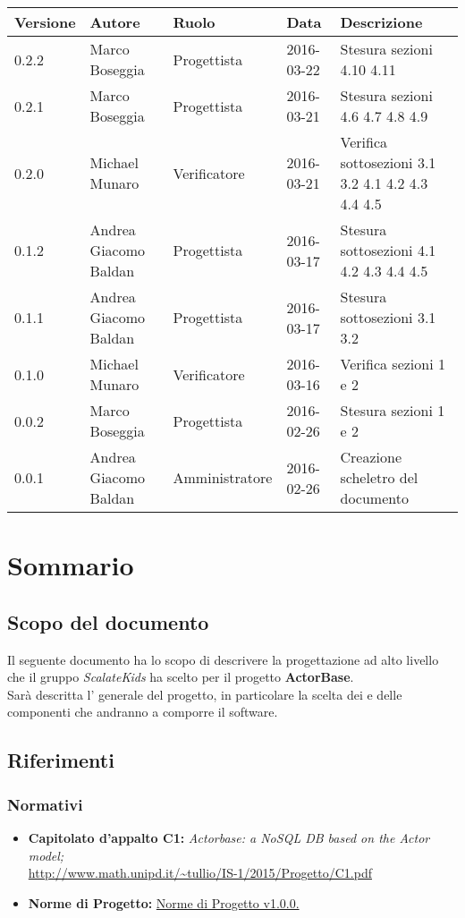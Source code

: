 \documentclass{scalatekids-article}
\begin{document}
\begin{center}
  \begin{tabular}{| l | l | l | l | p{5cm} |}
    \hline
    Versione & Autore & Ruolo & Data & Descrizione \\
    \hline
    0.2.2 & Marco Boseggia & Progettista & 2016-03-22 & Stesura sezioni 4.10 4.11\\
    \hline
    0.2.1 & Marco Boseggia & Progettista & 2016-03-21 & Stesura sezioni 4.6 4.7 4.8 4.9\\
    \hline
    0.2.0 & Michael Munaro & Verificatore & 2016-03-21 & Verifica sottosezioni 3.1 3.2 4.1 4.2 4.3 4.4 4.5\\
    \hline
    0.1.2 & Andrea Giacomo Baldan & Progettista & 2016-03-17 & Stesura sottosezioni 4.1 4.2 4.3 4.4 4.5\\
    \hline
    0.1.1 & Andrea Giacomo Baldan & Progettista & 2016-03-17 & Stesura sottosezioni 3.1 3.2\\
    \hline
    0.1.0 & Michael Munaro & Verificatore & 2016-03-16 & Verifica sezioni 1 e 2\\
    \hline
    0.0.2 & Marco Boseggia & Progettista & 2016-02-26 & Stesura sezioni 1 e 2\\
    \hline
    0.0.1 & Andrea Giacomo Baldan & Amministratore & 2016-02-26 & Creazione scheletro del documento\\
    \hline
  \end{tabular}
\end{center}
\tableofcontents
\newpage
{}
\section{Sommario}
\subsection{Scopo del documento}
Il seguente documento ha lo scopo di descrivere la progettazione ad alto livello che il gruppo \textit{ScalateKids} ha scelto per il progetto \textbf{ActorBase}.\\
Sarà descritta l' generale del progetto, in particolare la scelta dei  e delle componenti che andranno a comporre il software.
\prodPurpose
\glossExpl
\subsection{Riferimenti}
\subsubsection{Normativi}
\begin{itemize}
\item\textbf{Capitolato d'appalto C1:} \textit{Actorbase: a NoSQL DB based on the Actor model;}\\
  \url{http://www.math.unipd.it/~tullio/IS-1/2015/Progetto/C1.pdf}
\item\textbf{Norme di Progetto:} \href{run:../Interni/NormeDiProgetto\_v1.0.0.pdf}{Norme di Progetto v1.0.0.}
\end{itemize}
\end{document}
